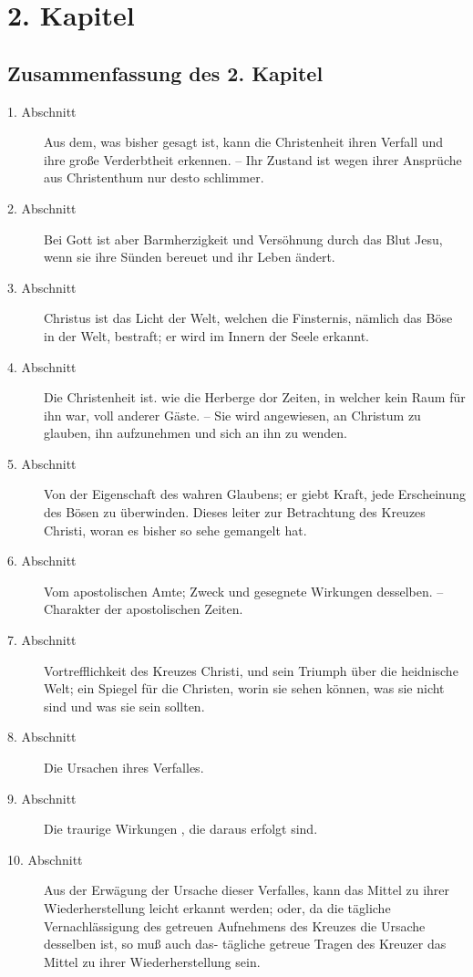 
\chapter{2. Kapitel}


\section{Zusammenfassung des 2. Kapitel}
\footnotesize
\begin{description}
\item[1. Abschnitt] Aus dem, was bisher gesagt ist, kann die Christenheit ihren
Verfall und ihre große Verderbtheit erkennen. -- Ihr Zustand ist wegen ihrer
Ansprüche aus Christenthum nur desto schlimmer.
\item[2. Abschnitt] Bei Gott ist aber Barmherzigkeit und Versöhnung durch das
Blut Jesu, wenn sie ihre Sünden bereuet und ihr Leben ändert.
\item[3. Abschnitt] Christus ist das Licht der Welt, welchen die Finsternis,
nämlich das Böse in der Welt, bestraft; er wird im Innern der Seele erkannt.
\item[4. Abschnitt] Die Christenheit ist. wie die Herberge dor Zeiten, in
welcher kein Raum für ihn war, voll anderer Gäste. -- Sie wird angewiesen, an
Christum zu glauben, ihn aufzunehmen und sich an ihn zu wenden.
\item[5. Abschnitt] Von der Eigenschaft des wahren Glaubens; er giebt Kraft,
jede Erscheinung des Bösen zu überwinden. Dieses leiter zur Betrachtung des
Kreuzes Christi, woran es bisher so sehe gemangelt hat.
\item[6. Abschnitt] Vom apostolischen Amte; Zweck und gesegnete Wirkungen
desselben. -- Charakter der apostolischen Zeiten.
\item[7. Abschnitt] Vortrefflichkeit des Kreuzes Christi, und sein Triumph über
die heidnische Welt; ein Spiegel für die Christen, worin sie sehen können, was
sie nicht sind und was sie sein sollten.
\item[8. Abschnitt] Die Ursachen ihres Verfalles.
\item[9. Abschnitt] Die traurige Wirkungen , die daraus erfolgt sind.
\item[10. Abschnitt] Aus der Erwägung der Ursache dieser Verfalles, kann das
Mittel zu ihrer Wiederherstellung leicht erkannt werden; oder, da die tägliche
Vernachlässigung des getreuen Aufnehmens des Kreuzes die Ursache desselben ist,
so muß auch das- tägliche getreue Tragen des Kreuzer das Mittel zu ihrer
Wiederherstellung sein.
\end{description}
\normalsize

